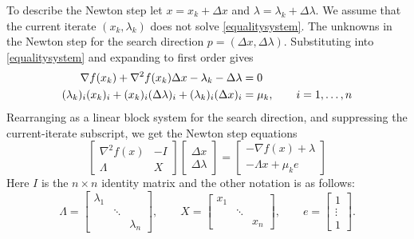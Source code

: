 \documentclass[11pt]{article}
\newcommand{\grad}{\nabla}
\begin{document}
To describe the Newton step let $x=x_k+\Delta x$ and $\lambda=\lambda_k+\Delta\lambda$.  We assume that the current iterate $(x_k,\lambda_k)$ does not solve \eqref{equalitysystem}.  The unknowns in the Newton step for the search direction $p=(\Delta x,\Delta \lambda)$.  Substituting into \eqref{equalitysystem} and expanding to first order gives
\begin{align}
\grad f(x_k) + \grad^2 f(x_k) \Delta x - \lambda_k - \Delta \lambda &= 0 \label{prenewtonstep} \\
(\lambda_k)_i (x_k)_i + (x_k)_i (\Delta\lambda)_i + (\lambda_k)_i (\Delta x)_i &= \mu_k, \qquad i=1,\dots,n \notag
\end{align}
Rearranging as a linear block system for the search direction, and suppressing the current-iterate subscript, we get the Newton step equations
\begin{equation}
\begin{bmatrix}
\grad^2 f(x) & - I \\
\Lambda & X
\end{bmatrix}
\begin{bmatrix}
\Delta x \\
\Delta \lambda
\end{bmatrix}
=
\begin{bmatrix}
-\grad f(x) + \lambda \\
-\Lambda x + \mu_k e
\end{bmatrix}
 \label{newtonstep}
\end{equation}
Here $I$ is the $n\times n$ identity matrix and the other notation is as follows:
    $$\Lambda = \begin{bmatrix} \lambda_1 & & \\ & \ddots & \\ & & \lambda_n \end{bmatrix}, \qquad X = \begin{bmatrix} x_1 & & \\ & \ddots & \\ & & x_n \end{bmatrix}, \qquad e = \begin{bmatrix} 1 \\ \vdots \\ 1 \end{bmatrix}.$$
\end{document}
